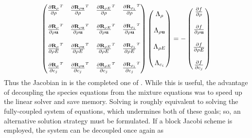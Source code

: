 \begin{equation}
  \begin{pmatrix}
    \rtdiff{\rho}{\rho} & \rtdiff{\rho \vu}{\rho} & 
    \rtdiff{\rho E}{\rho} & \rtdiff{\rho_i}{\rho} \\ \\
    \rtdiff{\rho}{\rho \vu} & \rtdiff{\rho \vu}{\rho \vu} & 
    \rtdiff{\rho E}{\rho \vu} & \rtdiff{\rho_i}{\rho \vu} \\ \\
    \rtdiff{\rho}{\rho E} & \rtdiff{\rho \vu}{\rho E} & 
    \rtdiff{\rho E}{\rho E} & \rtdiff{\rho_i}{\rho E} \\ \\
    \rtdiff{\rho}{c_j} & \rtdiff{\rho \vu}{c_j} & 
    \rtdiff{\rho E}{c_j} & \rtdiff{\rho_i}{c_j}
  \end{pmatrix}
  \begin{pmatrix}
    \adjlam{\rho} \\ \\
    \adjlam{\rho \vu} \\ \\
    \adjlam{\rho E} \\ \\
    \adjlam{c_i}
  \end{pmatrix}
  = -
  \begin{pmatrix}
    \pd{f}{\rho} \\ \\
    \pd{f}{\rho \vu} \\ \\
    \pd{f}{\rho E} \\ \\
    \pd{f}{c_j}
  \end{pmatrix}
  \label{full-adjoint}
\end{equation}
Thus the Jacobian in  is the completed one of
.  While this is useful, the advantage of
decoupling the species equations from the mixture equations was to speed up the
linear solver and save memory.  Solving  is roughly
equivalent to solving the fully-coupled system of equations, which undermines
both of these goals; so, an alternative solution strategy must be formulated.  If
a block Jacobi scheme is employed, the system can be decoupled once again as
